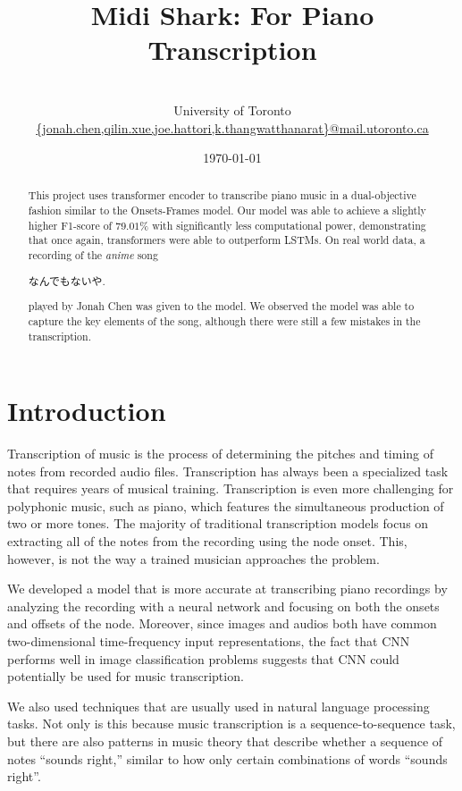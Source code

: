 \documentclass[a4paper,twocolumn,10pt]{article}
\title{\vspace{-50pt}\bfseries{\Large{Midi Shark: For Piano Transcription}}}
\author{\normalfont{Jonah Chen, QiLin Xue, Joe Hattori, Khanatat Thangwatthanarat}\\\small{University of Toronto}\\\vspace{-10pt}\small{\url{{jonah.chen,qilin.xue,joe.hattori,k.thangwatthanarat}@mail.utoronto.ca}}}
\date{\today}
\begin{document}
\maketitle
\begin{abstract}
  This project uses transformer encoder to transcribe piano music in a dual-objective fashion similar to the Onsets-Frames model\cite{onsets_and_frames}. Our model was able to achieve a slightly higher F1-score of \(79.01\%\) with significantly less computational power, demonstrating that once again, transformers were able to outperform LSTMs. On real world data, a recording of the \textit{anime} song \begin{CJK}{UTF8}{min}なんでもないや.\end{CJK} played by Jonah Chen was given to the model. We observed the model was able to capture the key elements of the song, although there were still a few mistakes in the transcription.
\end{abstract}

\section{Introduction}
Transcription of music is the process of determining the pitches and timing of notes from recorded audio files. Transcription has always been a specialized task that requires years of musical training. Transcription is even more challenging for polyphonic music, such as piano, which features the simultaneous production of two or more tones. The majority of traditional transcription models focus on extracting all of the notes from the recording using the node onset. This, however, is not the way a trained musician approaches the problem\cite{intro}.

We developed a model that is more accurate at transcribing piano recordings by analyzing the recording with a neural network and focusing on both the onsets and offsets of the node. Moreover, since images and audios both have common two-dimensional time-frequency input representations, the fact that CNN performs well in image classification problems suggests that CNN could potentially be used for music transcription\cite{onsets_and_frames}.

We also used techniques that are usually used in natural language processing tasks. Not only is this because music transcription is a sequence-to-sequence task, but there are also patterns in music theory that describe whether a sequence of notes ``sounds right,'' similar to how only certain combinations of words ``sounds right''\cite{onsets_and_frames}. 
\end{document}
